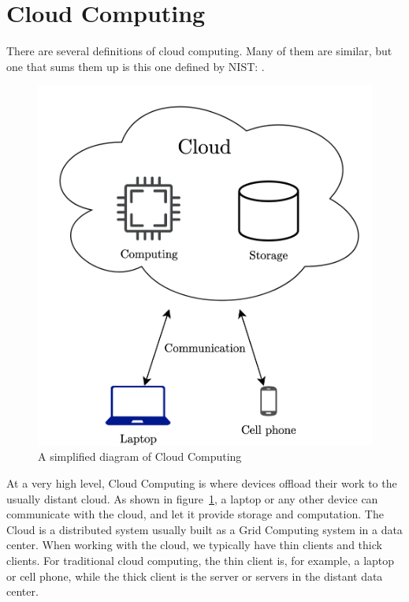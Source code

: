 \section{Cloud Computing}
There are several definitions of cloud computing. Many of them are similar, but one that sums them up is this one defined by NIST\cite{mell_nist_nodate}:
.


\begin{figure}[t]
    \centering
    \includegraphics[scale=0.7]{chapters/2_background/figures/Simplified_cloud.png}
    \caption{A simplified diagram of Cloud Computing}
    \label{fig:SimplifiedCloudDiagram}
\end{figure}

At a very high level, Cloud Computing is where devices offload their work to the usually distant cloud. As shown in figure~\ref{fig:SimplifiedCloudDiagram}, a laptop or any other device can communicate with the cloud, and let it provide storage and computation. The Cloud is a distributed system usually built as a Grid Computing system in a data center. When working with the cloud, we typically have thin clients and thick clients. For traditional cloud computing, the thin client is, for example, a laptop or cell phone, while the thick client is the server or servers in the distant data center. 

